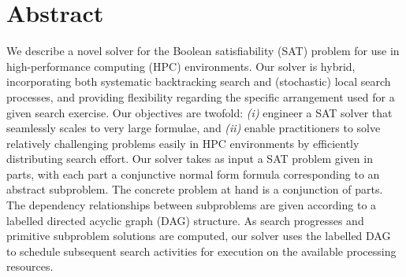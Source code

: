 \documentclass[
10pt, %
a4paper, %
oneside, %
headinclude,footinclude, %
BCOR5mm, %
]{scrartcl}
\title{\normalfont\spacedallcaps{Dagster}} %
\subtitle{A Parallel Structured SAT Solver \\ Midterm Progress Report Against Project Activities} %
\author{\spacedlowsmallcaps{Mark Burgess, Charles Gretton,}\\\spacedlowsmallcaps{Josh Milthorpe, Luke Croak}} %
\date{15 March 2021} %
\begin{document}
\renewcommand{\sectionmark}[1]{\markright{\spacedlowsmallcaps{#1}}} %
\lehead{\mbox{\llap{\small\thepage\kern1em\color{halfgray} \vline}\color{halfgray}\hspace{0.5em}\rightmark\hfil}} %
\pagestyle{scrheadings} %


\maketitle %


\section*{Abstract} %


We describe a novel solver for the Boolean satisfiability (SAT) problem for use in high-performance computing (HPC) environments.
Our solver is hybrid, incorporating both systematic backtracking search and (stochastic) local search processes, and providing flexibility regarding the specific arrangement used for a given search exercise. 
Our objectives are twofold: {\em (i)} engineer a SAT solver that seamlessly scales to very large formulae, and {\em (ii)} enable practitioners to solve relatively challenging problems easily in HPC environments by efficiently distributing search effort. 
Our solver takes as input a SAT problem given in parts, with each part a conjunctive normal form formula corresponding to an abstract subproblem.
The concrete problem at hand is a conjunction of parts.
The dependency relationships between subproblems are given according to a labelled directed acyclic graph (DAG) structure.
As search progresses and primitive subproblem solutions are computed, our solver uses the labelled DAG to schedule subsequent search activities for execution on the available processing resources.



\end{document}
